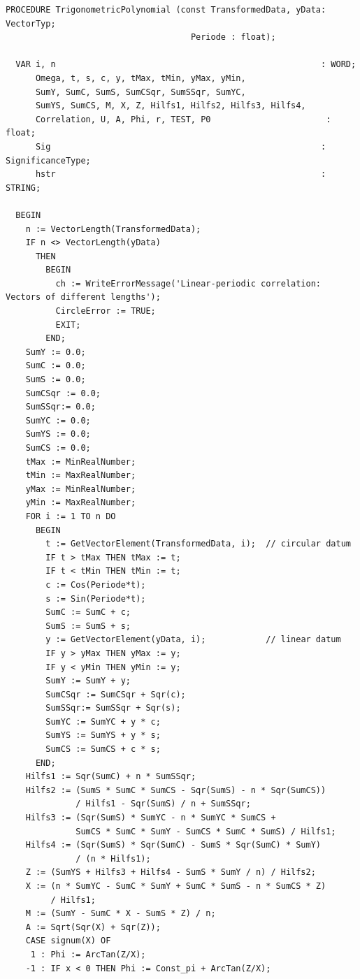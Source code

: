 \begin{refsection}
\begin{lstlisting}[caption=Fit a trigonometric polynomial]
  PROCEDURE TrigonometricPolynomial (const TransformedData, yData: VectorTyp;
                                     Periode : float);

  VAR i, n                                                     : WORD;
      Omega, t, s, c, y, tMax, tMin, yMax, yMin,
      SumY, SumC, SumS, SumCSqr, SumSSqr, SumYC,
      SumYS, SumCS, M, X, Z, Hilfs1, Hilfs2, Hilfs3, Hilfs4,
      Correlation, U, A, Phi, r, TEST, P0                       : float;
      Sig                                                      : SignificanceType;
      hstr                                                     : STRING;

  BEGIN
    n := VectorLength(TransformedData);
    IF n <> VectorLength(yData)
      THEN
        BEGIN
          ch := WriteErrorMessage('Linear-periodic correlation: Vectors of different lengths');
          CircleError := TRUE;
          EXIT;
        END;
    SumY := 0.0;
    SumC := 0.0;
    SumS := 0.0;
    SumCSqr := 0.0;
    SumSSqr:= 0.0;
    SumYC := 0.0;
    SumYS := 0.0;
    SumCS := 0.0;
    tMax := MinRealNumber;
    tMin := MaxRealNumber;
    yMax := MinRealNumber;
    yMin := MaxRealNumber;
    FOR i := 1 TO n DO
      BEGIN
        t := GetVectorElement(TransformedData, i);  // circular datum
        IF t > tMax THEN tMax := t;
        IF t < tMin THEN tMin := t;
        c := Cos(Periode*t);
        s := Sin(Periode*t);
        SumC := SumC + c;
        SumS := SumS + s;
        y := GetVectorElement(yData, i);            // linear datum
        IF y > yMax THEN yMax := y;
        IF y < yMin THEN yMin := y;
        SumY := SumY + y;
        SumCSqr := SumCSqr + Sqr(c);
        SumSSqr:= SumSSqr + Sqr(s);
        SumYC := SumYC + y * c;
        SumYS := SumYS + y * s;
        SumCS := SumCS + c * s;
      END;
    Hilfs1 := Sqr(SumC) + n * SumSSqr;
    Hilfs2 := (SumS * SumC * SumCS - Sqr(SumS) - n * Sqr(SumCS))
              / Hilfs1 - Sqr(SumS) / n + SumSSqr;
    Hilfs3 := (Sqr(SumS) * SumYC - n * SumYC * SumCS +
              SumCS * SumC * SumY - SumCS * SumC * SumS) / Hilfs1;
    Hilfs4 := (Sqr(SumS) * Sqr(SumC) - SumS * Sqr(SumC) * SumY)
              / (n * Hilfs1);
    Z := (SumYS + Hilfs3 + Hilfs4 - SumS * SumY / n) / Hilfs2;
    X := (n * SumYC - SumC * SumY + SumC * SumS - n * SumCS * Z)
         / Hilfs1;
    M := (SumY - SumC * X - SumS * Z) / n;
    A := Sqrt(Sqr(X) + Sqr(Z));
    CASE signum(X) OF
     1 : Phi := ArcTan(Z/X);
    -1 : IF x < 0 THEN Phi := Const_pi + ArcTan(Z/X);

\end{lstlisting}
\end{refsection}

